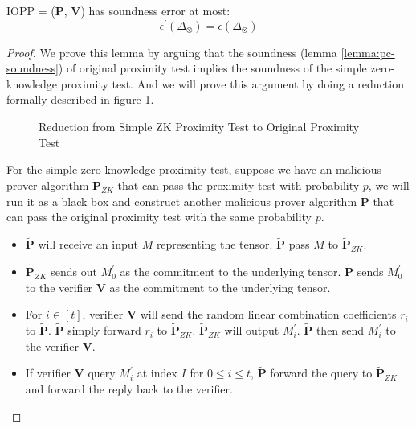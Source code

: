 \begin{lemma}
\label{lemma:szkpctc-soundness}


IOPP = ($\textbf{P}$, $\textbf{V}$) has soundness error at most:
$$
    \epsilon^\prime(\Delta_\otimes) = \epsilon(\Delta_\otimes)
$$

\end{lemma}
\begin{proof}

We prove this lemma by arguing that the soundness (lemma \ref{lemma:pc-soundness}) of original proximity test implies the soundness of the simple zero-knowledge proximity test. And we will prove this argument by doing a reduction formally described in figure \ref{img:red-soundness}.

\begin{figure}[ht]
\centering
\resizebox{\textwidth}{!}{

}
\caption{Reduction from Simple ZK Proximity Test to Original Proximity Test}
\label{img:red-soundness}
\end{figure}


For the simple zero-knowledge proximity test, suppose we have an malicious prover algorithm $\tilde{\textbf{P}}_{ZK}$ that can pass the proximity test with probability $p$, we will run it as a black box and construct another malicious prover algorithm $\tilde{\textbf{P}}$ that can pass the original proximity test with the same probability $p$.

\begin{itemize}
    \item $\tilde{\textbf{P}}$ will receive an input $M$ representing the tensor. $\tilde{\textbf{P}}$ pass $M$ to $\tilde{\textbf{P}}_{ZK}$.
    
    \item $\tilde{\textbf{P}}_{ZK}$ sends out $M_0^{\prime}$ as the commitment to the underlying tensor. 
    $\tilde{\textbf{P}}$ sends $M_0^\prime$ to the verifier \textbf{V}  as the commitment to the underlying tensor.
    
    \item For $i \in [t]$, verifier \textbf{V} will send the random linear combination coefficients $r_i$ to $\tilde{\textbf{P}}$. $\tilde{\textbf{P}}$ simply forward $r_i$ to $\tilde{\textbf{P}}_{ZK}$. $\tilde{\textbf{P}}_{ZK}$ will output $M_i^\prime$. $\tilde{\textbf{P}}$ then send $M_i^\prime$ to the verifier \textbf{V}. 
    
    \item If verifier \textbf{V} query $M_i^\prime$ at index $I$ for $0 \le i \le t$, $\tilde{\textbf{P}}$ forward the query to $\tilde{\textbf{P}}_{ZK}$ and forward the reply back to the verifier.
\end{itemize}


\end{proof}
